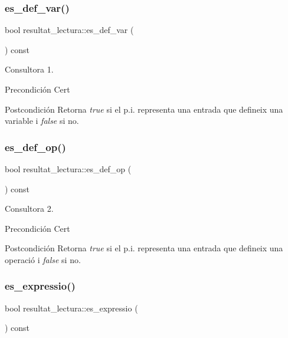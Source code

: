 \subsubsection{\texorpdfstring{es\+\_\+def\+\_\+var()}{es\_def\_var()}}
{\footnotesize\ttfamily bool resultat\+\_\+lectura\+::es\+\_\+def\+\_\+var (\begin{DoxyParamCaption}{ }\end{DoxyParamCaption}) const}



Consultora 1. 

\begin{DoxyPrecond}{Precondición}
Cert 
\end{DoxyPrecond}
\begin{DoxyPostcond}{Postcondición}
Retorna {\itshape true} si el p.\+i. representa una entrada que defineix una variable i {\itshape false} si no. 
\end{DoxyPostcond}
\hypertarget{classresultat__lectura_ac1f77e1379c99557c3bfdf2d627594f0}{}\label{classresultat__lectura_ac1f77e1379c99557c3bfdf2d627594f0} 
\subsubsection{\texorpdfstring{es\+\_\+def\+\_\+op()}{es\_def\_op()}}
{\footnotesize\ttfamily bool resultat\+\_\+lectura\+::es\+\_\+def\+\_\+op (\begin{DoxyParamCaption}{ }\end{DoxyParamCaption}) const}



Consultora 2. 

\begin{DoxyPrecond}{Precondición}
Cert 
\end{DoxyPrecond}
\begin{DoxyPostcond}{Postcondición}
Retorna {\itshape true} si el p.\+i. representa una entrada que defineix una operació i {\itshape false} si no. 
\end{DoxyPostcond}
\hypertarget{classresultat__lectura_a0e73a239ad6dd63b591105a5553bef6f}{}\label{classresultat__lectura_a0e73a239ad6dd63b591105a5553bef6f} 
\subsubsection{\texorpdfstring{es\+\_\+expressio()}{es\_expressio()}}
{\footnotesize\ttfamily bool resultat\+\_\+lectura\+::es\+\_\+expressio (\begin{DoxyParamCaption}{ }\end{DoxyParamCaption}) const}



